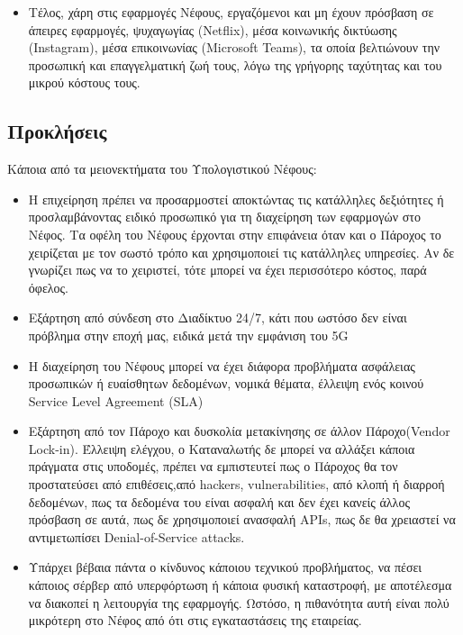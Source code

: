 \documentclass{article}
\begin{document}
\begin{itemize}
\item	Τέλος, χάρη στις εφαρμογές Νέφους, εργαζόμενοι και μη έχουν πρόσβαση σε άπειρες εφαρμογές, ψυχαγωγίας (Netflix), μέσα κοινωνικής δικτύωσης (Instagram), μέσα επικοινωνίας (Microsoft Teams), τα οποία βελτιώνουν την προσωπική και επαγγελματική ζωή τους, λόγω της γρήγορης ταχύτητας και του μικρού κόστους τους.
\end{itemize}
\subsection{Προκλήσεις}
Κάποια από τα μειονεκτήματα του Υπολογιστικού Νέφους:
\begin{itemize}
\item	Η επιχείρηση πρέπει να προσαρμοστεί αποκτώντας τις κατάλληλες δεξιότητες ή προσλαμβάνοντας ειδικό προσωπικό για τη διαχείρηση των εφαρμογών στο Νέφος. Τα οφέλη του Νέφους έρχονται στην επιφάνεια όταν και ο Πάροχος το χειρίζεται με τον σωστό τρόπο και χρησιμοποιεί τις κατάλληλες υπηρεσίες. Αν δε γνωρίζει πως να το χειριστεί, τότε μπορεί να έχει περισσότερο κόστος, παρά όφελος.
\item	Εξάρτηση από σύνδεση στο Διαδίκτυο 24/7, κάτι που ωστόσο δεν είναι πρόβλημα στην εποχή μας, ειδικά μετά την εμφάνιση του 5G
\item	Η διαχείρηση του Νέφους μπορεί να έχει διάφορα προβλήματα ασφάλειας προσωπικών ή ευαίσθητων δεδομένων,  νομικά θέματα, έλλειψη ενός κοινού Service Level Agreement (SLA)
\item	Εξάρτηση από τον Πάροχο και δυσκολία μετακίνησης σε άλλον Πάροχο(Vendor Lock-in).  Έλλειψη ελέγχου, ο Καταναλωτής δε μπορεί να αλλάξει κάποια πράγματα στις υποδομές, πρέπει να εμπιστευτεί πως ο Πάροχος θα τον προστατεύσει από επιθέσεις,από hackers, vulnerabilities, από κλοπή ή διαρροή δεδομένων, πως τα δεδομένα του είναι ασφαλή και δεν έχει κανείς άλλος πρόσβαση σε αυτά, πως δε χρησιμοποιεί ανασφαλή APIs, πως δε θα χρειαστεί να αντιμετωπίσει  Denial-of-Service attacks.
\item	Υπάρχει βέβαια πάντα ο κίνδυνος κάποιου τεχνικού προβλήματος, να πέσει κάποιος σέρβερ από υπερφόρτωση ή κάποια φυσική καταστροφή, με αποτέλεσμα να διακοπεί η λειτουργία της εφαρμογής. Ωστόσο, η πιθανότητα αυτή είναι πολύ μικρότερη στο Νέφος από ότι στις εγκαταστάσεις της εταιρείας.

\end{itemize}
\end{document}
